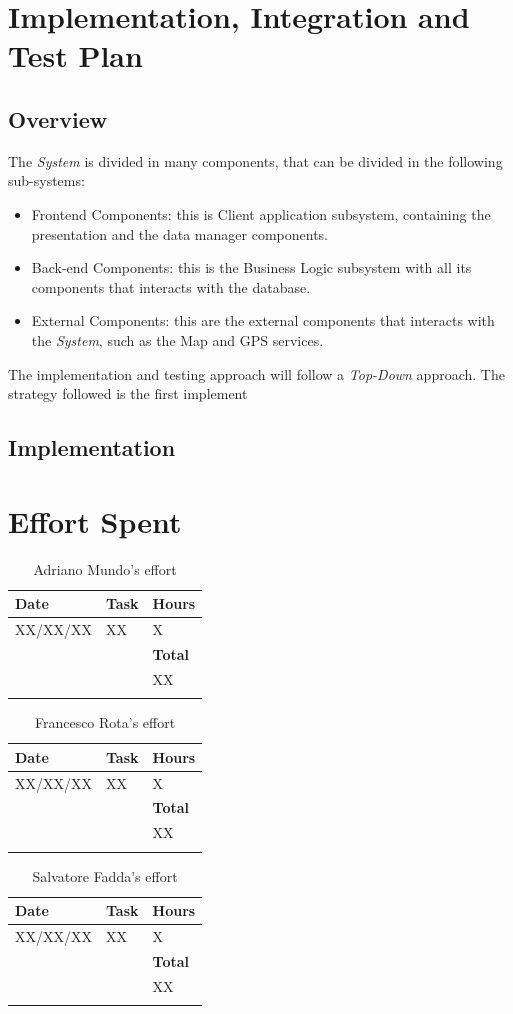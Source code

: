 \documentclass{article}
\begin{document}
	\pagebreak
	
	
\section{Implementation, Integration and Test Plan}
	\subsection{Overview}
	The {\it System} is divided in many components, that can be divided in the following sub-systems:
	\begin{itemize}
		\item Frontend Components: this is Client application subsystem, containing the presentation and the data manager components.
		\item Back-end Components: this is the Business Logic subsystem with all its components that interacts with the database. 
		\item External Components: this are the external components that interacts with the {\it System}, such as the Map and GPS services.  
	\end{itemize}
	The implementation and testing approach will follow a {\it Top-Down} approach. The strategy followed is the first implement
		
	\subsection{Implementation}
	
	\pagebreak
		
\section{Effort Spent}
\begin{longtable}{| p{2 cm} | p{6 cm} | p{1 cm} |} 
			\hline
			{\bf Date} & {\bf Task} & {\bf Hours}\\
			\hline
			XX/XX/XX & XX & X \\
			\hline
			& & {\bf Total} \\
			\hline
			& & XX \\
			\hline
			\caption{Adriano Mundo's effort} 
\end{longtable}

\begin{longtable}{| p{2 cm} | p{6 cm} | p{1 cm} |} 
			\hline
			{\bf Date} & {\bf Task} & {\bf Hours}\\
			\hline
			XX/XX/XX & XX & X \\
			\hline
			& & {\bf Total} \\
			\hline
			& & XX \\
			\hline
			\caption{Francesco Rota's effort} 
\end{longtable}

\begin{longtable}{| p{2 cm} | p{6 cm} | p{1 cm} |} 
			\hline
			{\bf Date} & {\bf Task} & {\bf Hours}\\
			\hline
			XX/XX/XX & XX & X \\
			\hline
			& & {\bf Total} \\
			\hline
			& & XX \\
			\hline
			\caption{Salvatore Fadda's effort} 
\end{longtable}
	
	
\end{document}
